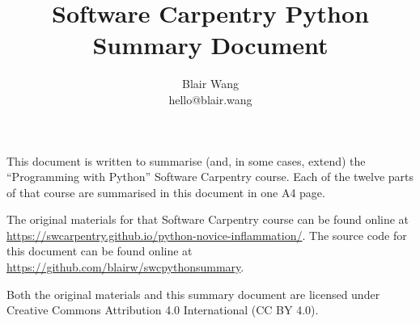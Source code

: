 \documentclass[landscape, hidelinks,10pt]{article}
\begin{document}
\begin{multicols*}{2}


\title{Software Carpentry Python\\Summary Document}
\author{Blair Wang\\hello@blair.wang}

\maketitle

\par
This document is written to summarise (and, in some cases, extend) the ``Programming with Python'' Software Carpentry course. Each of the twelve parts of that course are summarised in this document in one A4 page.

\par
The original materials for that Software Carpentry course can be found online at \url{https://swcarpentry.github.io/python-novice-inflammation/}. The source code for this document can be found online at \url{https://github.com/blairw/swcpythonsummary}.

\par
Both the original materials and this summary document are licensed under Creative Commons Attribution 4.0 International (CC BY 4.0).

\columnbreak
\tableofcontents

\end{multicols*}

\raggedright




\end{document}
